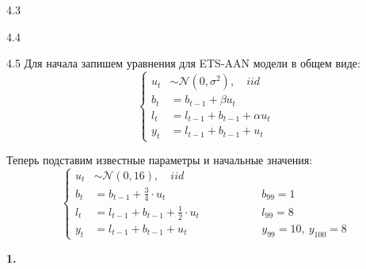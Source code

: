 \protect \hypertarget {soln:4.3}{}
\begin{solution}{{4.3}}
\end{solution}
\protect \hypertarget {soln:4.4}{}
\begin{solution}{{4.4}}
\end{solution}
\protect \hypertarget {soln:4.5}{}
\begin{solution}{{4.5}}
Для начала запишем уравнения для ETS-AAN модели в общем виде:
\[
    \left\{\begin{aligned}
        u_t &\sim \mathcal{N}(0, \sigma^2), \quad iid \\
        b_t &= b_{t-1} + \beta u_t \\
        l_t &= l_{t-1} + b_{t-1} + \alpha u_t \\
        y_t &= l_{t-1} + b_{t-1} + u_t
    \end{aligned}\right.
\]

Теперь подставим известные параметры и начальные значения:
\[
    \left\{\begin{aligned}
        u_t &\sim \mathcal{N}(0, 16), \quad iid \\
        b_t &= b_{t-1} + \frac{3}{4} \cdot u_t && b_{99}=1 \\
        l_t &= l_{t-1} + b_{t-1} + \frac{1}{2} \cdot u_t \qquad \qquad && l_{99}=8 \\
        y_t &= l_{t-1} + b_{t-1} + u_t && y_{99}=10, \ y_{100}=8
    \end{aligned}\right.
\]

\textbf{1.}


\end{solution}
